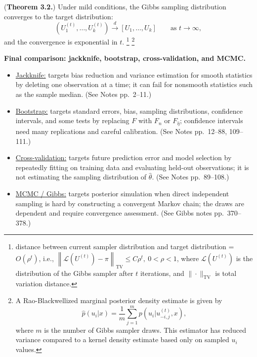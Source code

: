 (\textbf{Theorem 3.2.})
Under mild conditions, the Gibbs sampling distribution converges to the target distribution:
\[
    (U_1^{(t)},\ldots,U_k^{(t)})
    \stackrel{d}{\rightarrow} 
    [U_1,\ldots,U_k]
    \qquad \text{as } t\to\infty,
\]
and the convergence is exponential in $t$.
\footnote{distance between current sampler distribution and target distribution = $O(\rho^t)$, i.e., $\left\|\mathcal{L}\!\left(U^{(t)}\right)-\pi\right\|_{\mathrm{TV}} \leq C\rho^t, \ 0<\rho<1$, where $\mathcal L(U^{(t)})$ is the distribution of the Gibbs sampler after $t$ iterations, and $\|\cdot\|_{\mathrm{TV}}$ is total variation distance.} 
\footnote{A Rao-Blackwellized marginal posterior density estimate is given by
\[
    \hat p(u_i | x)= \frac{1}{m} \sum_{j=1}^m p(u_i | u_{-i, j}^{(t)}, x),
\]
where $m$ is the number of Gibbs sampler draws. This estimator has reduced variance compared to a kernel density estimate based only on sampled $u_i$ values.
}


\begin{mybox}
\textbf{Final comparison: jackknife, bootstrap, cross-validation, and MCMC.}
\begin{itemize}
    \item \underline{Jackknife:} targets bias reduction and variance estimation for smooth statistics by deleting one observation at a time; it can fail for nonsmooth statistics such as the sample median. (See Notes pp.~2--11.)
    \item \underline{Bootstrap:} targets standard errors, bias, sampling distributions, confidence intervals, and some tests by replacing $F$ with $F_n$ or $F_{\hat\eta}$; confidence intervals need many replications and careful calibration. (See Notes pp.~12--88, 109--111.)
    \item \underline{Cross-validation:} targets future prediction error and model selection by repeatedly fitting on training data and evaluating held-out observations; it is not estimating the sampling distribution of $\hat\theta$. (See Notes pp.~89--108.)
    \item \underline{MCMC / Gibbs:} targets posterior simulation when direct independent sampling is hard by constructing a convergent Markov chain; the draws are dependent and require convergence assessment. (See Gibbs notes pp.~370--378.)
\end{itemize}
\end{mybox}

